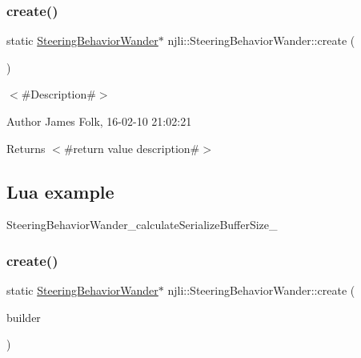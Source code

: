 \subsubsection{\texorpdfstring{create()}{create()}\hspace{0.1cm}{\footnotesize\ttfamily [1/2]}}
{\footnotesize\ttfamily static \mbox{\hyperlink{classnjli_1_1_steering_behavior_wander}{Steering\+Behavior\+Wander}}$\ast$ njli\+::\+Steering\+Behavior\+Wander\+::create (\begin{DoxyParamCaption}{ }\end{DoxyParamCaption})\hspace{0.3cm}{\ttfamily [static]}}



$<$\#\+Description\#$>$ 

\begin{DoxyAuthor}{Author}
James Folk, 16-\/02-\/10 21\+:02\+:21
\end{DoxyAuthor}
\begin{DoxyReturn}{Returns}
$<$\#return value description\#$>$
\end{DoxyReturn}
\hypertarget{classnjli_1_1_steering_behavior_wander_ex1}{}\subsection{Lua example}\label{classnjli_1_1_steering_behavior_wander_ex1}

\begin{DoxyCodeInclude}
\end{DoxyCodeInclude}
Steering\+Behavior\+Wander\+\_\+calculate\+Serialize\+Buffer\+Size\+\_\+ \mbox{\label{classnjli_1_1_steering_behavior_wander_ae2796d13bfc81d2081d5cd06d1852647}} 
\subsubsection{\texorpdfstring{create()}{create()}\hspace{0.1cm}{\footnotesize\ttfamily [2/2]}}
{\footnotesize\ttfamily static \mbox{\hyperlink{classnjli_1_1_steering_behavior_wander}{Steering\+Behavior\+Wander}}$\ast$ njli\+::\+Steering\+Behavior\+Wander\+::create (\begin{DoxyParamCaption}\item[{const \mbox{\hyperlink{classnjli_1_1_steering_behavior_wander_builder}{Steering\+Behavior\+Wander\+Builder}} \&}]{builder }\end{DoxyParamCaption})\hspace{0.3cm}{\ttfamily [static]}}



